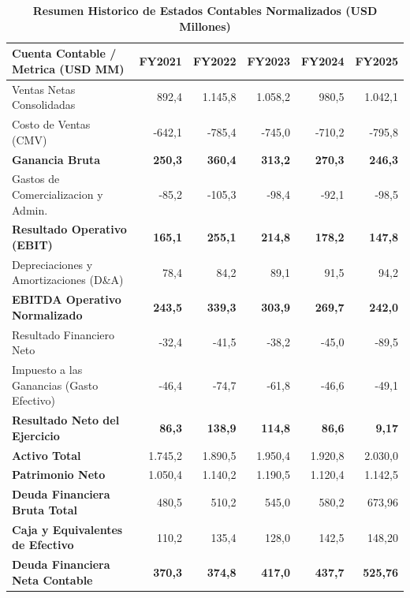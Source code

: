 \documentclass[10pt,a4paper]{article}
\theoremstyle{definition}
\begin{document}
\begin{table}[H]
\centering
\caption{\textbf{Resumen Historico de Estados Contables Normalizados (USD Millones)}}
\small
\begin{tabular}{lrrrrr}
\toprule
\textbf{Cuenta Contable / Metrica (USD MM)} & \textbf{FY2021} & \textbf{FY2022} & \textbf{FY2023} & \textbf{FY2024} & \textbf{FY2025} \\
\midrule
Ventas Netas Consolidadas & 892,4 & 1.145,8 & 1.058,2 & 980,5 & 1.042,1 \\
Costo de Ventas (CMV) & -642,1 & -785,4 & -745,0 & -710,2 & -795,8 \\
\midrule
\textbf{Ganancia Bruta} & \textbf{250,3} & \textbf{360,4} & \textbf{313,2} & \textbf{270,3} & \textbf{246,3} \\
Gastos de Comercializacion y Admin. & -85,2 & -105,3 & -98,4 & -92,1 & -98,5 \\
\midrule
\textbf{Resultado Operativo (EBIT)} & \textbf{165,1} & \textbf{255,1} & \textbf{214,8} & \textbf{178,2} & \textbf{147,8} \\
Depreciaciones y Amortizaciones (D\&A) & 78,4 & 84,2 & 89,1 & 91,5 & 94,2 \\
\midrule
\textbf{EBITDA Operativo Normalizado} & \textbf{243,5} & \textbf{339,3} & \textbf{303,9} & \textbf{269,7} & \textbf{242,0} \\
Resultado Financiero Neto & -32,4 & -41,5 & -38,2 & -45,0 & -89,5 \\
Impuesto a las Ganancias (Gasto Efectivo) & -46,4 & -74,7 & -61,8 & -46,6 & -49,1 \\
\midrule
\textbf{Resultado Neto del Ejercicio} & \textbf{86,3} & \textbf{138,9} & \textbf{114,8} & \textbf{86,6} & \textbf{9,17} \\
\midrule
\textbf{Activo Total} & 1.745,2 & 1.890,5 & 1.950,4 & 1.920,8 & 2.030,0 \\
\textbf{Patrimonio Neto} & 1.050,4 & 1.140,2 & 1.190,5 & 1.120,4 & 1.142,5 \\
\textbf{Deuda Financiera Bruta Total} & 480,5 & 510,2 & 545,0 & 580,2 & 673,96 \\
\textbf{Caja y Equivalentes de Efectivo} & 110,2 & 135,4 & 128,0 & 142,5 & 148,20 \\
\textbf{Deuda Financiera Neta Contable} & \textbf{370,3} & \textbf{374,8} & \textbf{417,0} & \textbf{437,7} & \textbf{525,76} \\
\bottomrule
\end{tabular}
\end{table}
\end{document}
